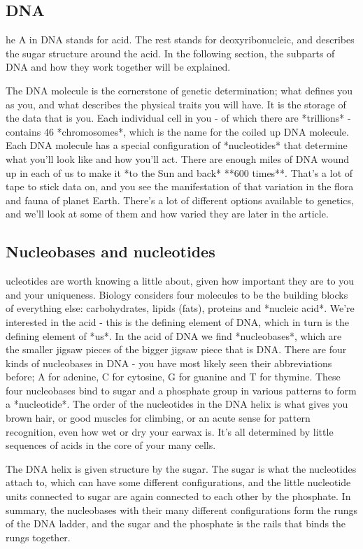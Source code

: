 \subsection*{DNA}
he A in DNA stands for acid. The rest stands for deoxyribonucleic, and describes the sugar structure around the acid. In the following section, the subparts of DNA and how they work together will be explained. 

The DNA molecule is the cornerstone of genetic determination; what defines you as you, and what describes the physical traits you will have.  It is the storage of the data that is you. Each individual cell in you - of which there are *trillions* - contains 46 *chromosomes*, which is the name for the coiled up DNA molecule. Each DNA molecule has a special configuration of *nucleotides* that determine what you'll look like and how you'll act. There are enough miles of DNA wound up in each of us to make it *to the Sun and back* **600 times**. That's a lot of tape to stick data on, and you see the manifestation of that variation in the flora and fauna of planet Earth. There's a lot of different options available to genetics, and we'll look at some of them and how varied they are later in the article. 

\subsection*{Nucleobases and nucleotides}
ucleotides are worth knowing a little about, given how important they are to you and your uniqueness. Biology considers four molecules to be the building blocks of everything else: carbohydrates, lipids (fats), proteins and *nucleic acid*. We're interested in the acid - this is the defining element of DNA, which in turn is the defining element of *us*. In the acid of DNA we find *nucleobases*, which are the smaller jigsaw pieces of the bigger jigsaw piece that is DNA. There are four kinds of nucleobases in DNA - you have most likely seen their abbreviations before; A for adenine, C for cytosine, G for guanine and T for thymine. These four nucleobases bind to sugar and a phosphate group in various patterns to form a *nucleotide*. The order of the nucleotides in the DNA helix is what gives you brown hair, or good muscles for climbing, or an acute sense for pattern recognition, even how wet or dry your earwax is. It's all determined by little sequences of acids in the core of your many cells.

The DNA helix is given structure by the sugar. The sugar is what the nucleotides attach to, which can have some different configurations, and the little nucleotide units connected to sugar are again connected to each other by the phosphate. In summary, the nucleobases with their many different configurations form the rungs of the DNA ladder, and the sugar and the phosphate is the rails that binds the rungs together.

